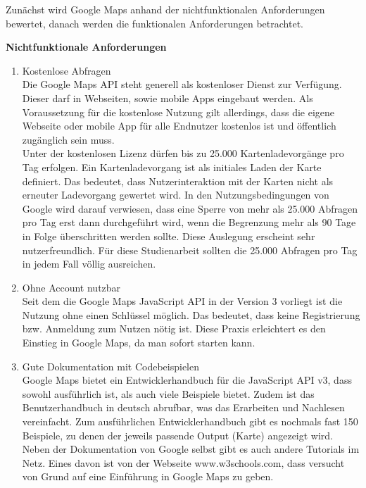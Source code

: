 Zunächst wird Google Maps anhand der nichtfunktionalen Anforderungen bewertet, danach werden die funktionalen Anforderungen betrachtet.

\textbf{Nichtfunktionale Anforderungen}
\begin{enumerate}
\item Kostenlose Abfragen \\
Die Google Maps API steht generell als kostenloser Dienst zur Verfügung. Dieser darf in Webseiten, sowie mobile Apps eingebaut werden. Als Voraussetzung für die kostenlose Nutzung gilt allerdings, dass die eigene Webseite oder mobile App für alle Endnutzer kostenlos ist und öffentlich zugänglich sein muss.\\
Unter der kostenlosen Lizenz dürfen bis zu 25.000 Kartenladevorgänge pro Tag erfolgen. Ein Kartenladevorgang ist als initiales Laden der Karte definiert. Das bedeutet, dass Nutzerinteraktion mit der Karten nicht als erneuter Ladevorgang gewertet wird. 
In den Nutzungsbedingungen von Google wird darauf verwiesen, dass eine Sperre von mehr als 25.000 Abfragen pro Tag erst dann durchgeführt wird, wenn die Begrenzung mehr als 90 Tage in Folge überschritten werden sollte.
Diese Auslegung erscheint sehr nutzerfreundlich. Für diese Studienarbeit sollten die 25.000 Abfragen pro Tag in jedem Fall völlig ausreichen. \cite[Nutzungsbedingungen]{googlemaps}\cite[Lizenzierung]{googlemaps}


\item Ohne Account nutzbar\\


Seit dem die Google Maps JavaScript API in der Version 3 vorliegt ist die Nutzung ohne einen Schlüssel möglich. Das bedeutet, dass keine Registrierung bzw. Anmeldung zum Nutzen nötig ist. Diese Praxis erleichtert es den Einstieg in Google Maps, da man sofort starten kann. \cite{googlemapsblog}


\item Gute Dokumentation mit Codebeispielen\\
Google Maps bietet ein Entwicklerhandbuch für die JavaScript API v3, dass sowohl ausführlich ist, als auch viele Beispiele bietet. Zudem ist das Benutzerhandbuch in deutsch abrufbar, was das Erarbeiten und Nachlesen vereinfacht. 
Zum ausführlichen Entwicklerhandbuch gibt es nochmals fast 150 Beispiele, zu denen der jeweils passende Output (Karte) angezeigt wird.\cite[Documentation]{googlemaps} \\
Neben der Dokumentation von Google selbst gibt es auch andere Tutorials im Netz. Eines davon ist von der Webseite www.w3schools.com, dass versucht von Grund auf eine Einführung in Google Maps zu geben. 



\end{enumerate}


